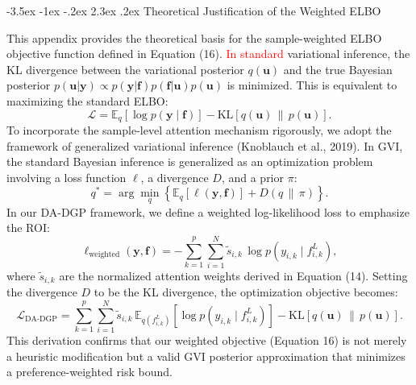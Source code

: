 \documentclass[11pt]{article}
\makeatletter
\renewcommand\section{\@startsection {section}{1}{\z@}%
	{-3.5ex \@plus -1ex \@minus -.2ex}%
	{2.3ex \@plus.2ex}%
	{\normalfont\fontfamily{phv}\fontsize{16}{19}\bfseries}}
\makeatother
\begin{document}
	\section{Theoretical Justification of the Weighted ELBO} \label{app:C}
	\resetappendixcounters %

	This appendix provides the theoretical basis for the sample-weighted ELBO objective function defined in Equation (16). \textcolor{red}{In standard} variational inference, the KL divergence between the variational posterior $q(\mathbf{u})$ and the true Bayesian posterior $p(\mathbf{u}|\mathbf{y}) \propto p(\mathbf{y}|\mathbf{f})p(\mathbf{f}|\mathbf{u})p(\mathbf{u})$ is minimized. This is equivalent to maximizing the standard ELBO:%
	\begin{equation}
		\mathcal{L}
		= \mathbb{E}_{q}\!\left[\log p(\mathbf{y}\mid \mathbf{f})\right]
		- \mathrm{KL}\!\left[q(\mathbf{u})\,\|\,p(\mathbf{u})\right].
	\end{equation}
	To incorporate the sample-level attention mechanism rigorously, we adopt the framework of generalized variational inference (Knoblauch et al., 2019). In GVI, the standard Bayesian inference is generalized as an optimization problem involving a loss function $\ell$, a divergence $D$, and a prior $\pi$:
	\begin{equation}
		q^{\ast}
		= \arg\min_{q}\left\{\mathbb{E}_{q}\!\left[\ell(\mathbf{y},\mathbf{f})\right] + D\!\left(q\,\|\,\pi\right)\right\}.
	\end{equation}
	In our DA-DGP framework, we define a weighted log-likelihood loss to emphasize the ROI:
	\begin{equation}
		\ell_{\mathrm{weighted}}(\mathbf{y},\mathbf{f})
		= -\sum_{k=1}^{p}\sum_{i=1}^{N}\tilde{s}_{i,k}\,\log p\!\left(y_{i,k}\mid f^{L}_{i,k}\right),
	\end{equation}
	where $\tilde{s}_{i,k}$ are the normalized attention weights derived in Equation (14). Setting the divergence $D$ to be the KL divergence, the optimization objective becomes:
	\begin{equation}
		\mathcal{L}_{\mathrm{DA\text{-}DGP}}
		= \sum_{k=1}^{p}\sum_{i=1}^{N}\tilde{s}_{i,k}\,
		\mathbb{E}_{q(f^{L}_{i,k})}\!\left[\log p\!\left(y_{i,k}\mid f^{L}_{i,k}\right)\right]
		- \mathrm{KL}\!\left[q(\mathbf{u})\,\|\,p(\mathbf{u})\right].
	\end{equation}
	This derivation confirms that our weighted objective (Equation 16) is not merely a heuristic modification but a valid GVI posterior approximation that minimizes a preference-weighted risk bound.
\end{document}
